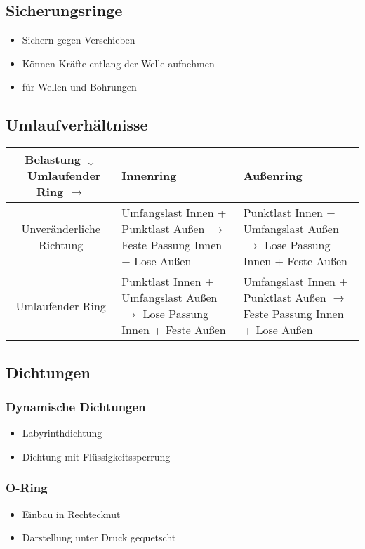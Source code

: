 \documentclass[a4paper,parskip=half*,DIV=7,fontsize=11pt]{scrartcl}
\begin{document}
\subsection{Sicherungsringe}
\begin{itemize}
	\item Sichern gegen Verschieben
	\item Können Kräfte entlang der Welle aufnehmen
	\item für Wellen und Bohrungen 
\end{itemize}
	
\subsection{Umlaufverhältnisse}
\begin{tabular}{|c|p{5cm}|p{5cm}|}
	\hline
	Belastung $\downarrow$ \ Umlaufender Ring $\rightarrow$ & Innenring                                                                              & Außenring                                                                             \\
	\hline
	Unveränderliche Richtung                               & Umfangslast Innen + Punktlast Außen  $\rightarrow$  Feste Passung Innen + Lose Außen & Punktlast Innen + Umfangslast Außen  $\rightarrow$  Lose Passung Innen + Feste Außen \\
	\hline
	Umlaufender Ring                                        & Punktlast Innen + Umfangslast Außen  $\rightarrow$ Lose Passung Innen + Feste Außen  & Umfangslast Innen + Punktlast Außen  $\rightarrow$ Feste Passung Innen + Lose Außen  \\
	\hline
\end{tabular}
	
\subsection{Dichtungen}
\subsubsection{Dynamische Dichtungen}
\begin{itemize}
	\item Labyrinthdichtung
	\item Dichtung mit Flüssigkeitssperrung 
\end{itemize}
	
\subsubsection{O-Ring}
\begin{itemize}
	\item Einbau in Rechtecknut
	\item Darstellung unter Druck gequetscht
\end{itemize}
	
\end{document}

